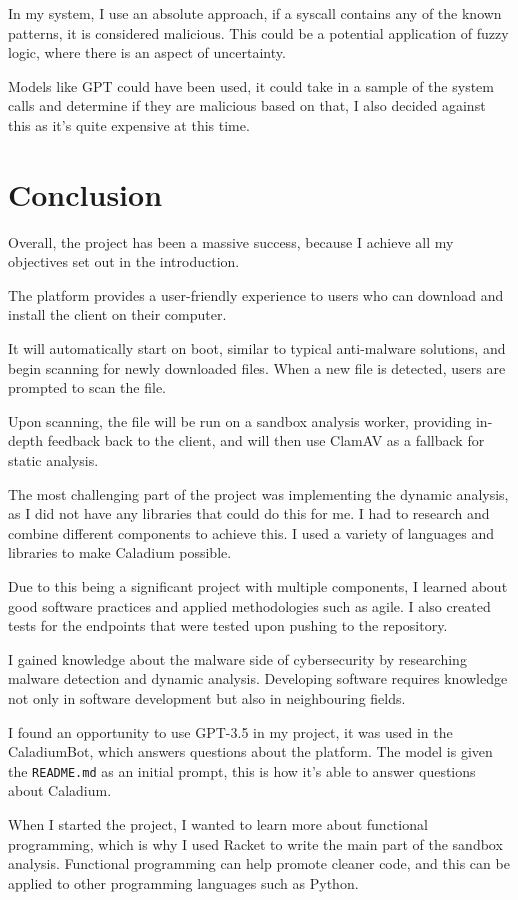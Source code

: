 In my system, I use an absolute approach, 
if a syscall contains any of the known patterns,
it is considered malicious.
This could be a potential application of fuzzy logic,
where there is an aspect of uncertainty.

Models like GPT could have been used,
it could take in a sample of the system calls and
determine if they are malicious based on that,
I also decided against this as it's quite expensive at this time.

\section{Conclusion}
Overall, the project has been a massive success,
because I achieve all my objectives set out in the introduction.

The platform provides a user-friendly experience to
users who can download and install the client on their computer.

It will automatically start on boot, similar to typical anti-malware solutions,
and begin scanning for newly downloaded files.
When a new file is detected, users are prompted to scan the file.

Upon scanning, the file will be run on a sandbox analysis worker,
providing in-depth feedback back to the client,
and will then use ClamAV as a fallback for static analysis.

The most challenging part of the project was implementing the dynamic analysis,
as I did not have any libraries that could do this for me.
I had to research and combine different components to achieve this.
I used a variety of languages and libraries to make Caladium possible.

Due to this being a significant project with multiple components,
I learned about good software practices and applied methodologies such as agile.
I also created tests for the endpoints that were tested upon pushing to the repository.

I gained knowledge about the malware side
of cybersecurity by researching malware detection
and dynamic analysis. \cite{10.1145/3329786}
Developing software requires knowledge not only in software development but also in neighbouring fields.

I found an opportunity to use GPT-3.5 in my project,
it was used in the CaladiumBot, which answers questions about the platform.
The model is given the \texttt{README.md} as an initial prompt,
this is how it's able to answer questions about Caladium.

When I started the project, I wanted to learn more about functional programming,
which is why I used Racket to write the main part of the sandbox analysis.
Functional programming can help promote cleaner code,
and this can be applied to other programming languages such as Python.
